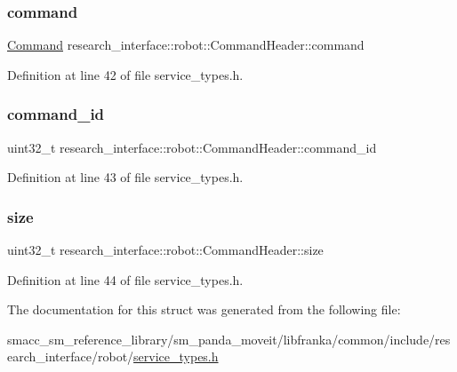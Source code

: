\subsubsection{\texorpdfstring{command}{command}}
{\footnotesize\ttfamily \hyperlink{namespaceresearch__interface_1_1robot_a72624b344f0614e623ef21a53fb0aa50}{Command} research\+\_\+interface\+::robot\+::\+Command\+Header\+::command}



Definition at line 42 of file service\+\_\+types.\+h.

\mbox{\label{structresearch__interface_1_1robot_1_1CommandHeader_a915f5eddf273cb6279e817b2aa80a5bb}} 
\subsubsection{\texorpdfstring{command\+\_\+id}{command\_id}}
{\footnotesize\ttfamily uint32\+\_\+t research\+\_\+interface\+::robot\+::\+Command\+Header\+::command\+\_\+id}



Definition at line 43 of file service\+\_\+types.\+h.

\mbox{\label{structresearch__interface_1_1robot_1_1CommandHeader_a1f4f17f7edc9169e3eb0ca7480d17b34}} 
\subsubsection{\texorpdfstring{size}{size}}
{\footnotesize\ttfamily uint32\+\_\+t research\+\_\+interface\+::robot\+::\+Command\+Header\+::size}



Definition at line 44 of file service\+\_\+types.\+h.



The documentation for this struct was generated from the following file\+:\begin{DoxyCompactItemize}
\item 
smacc\+\_\+sm\+\_\+reference\+\_\+library/sm\+\_\+panda\+\_\+moveit/libfranka/common/include/research\+\_\+interface/robot/\hyperlink{service__types_8h}{service\+\_\+types.\+h}\end{DoxyCompactItemize}

